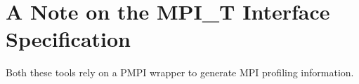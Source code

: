 \section{A Note on the MPI\_T Interface Specification}
\par Both these tools rely on a PMPI wrapper to generate MPI profiling information.

